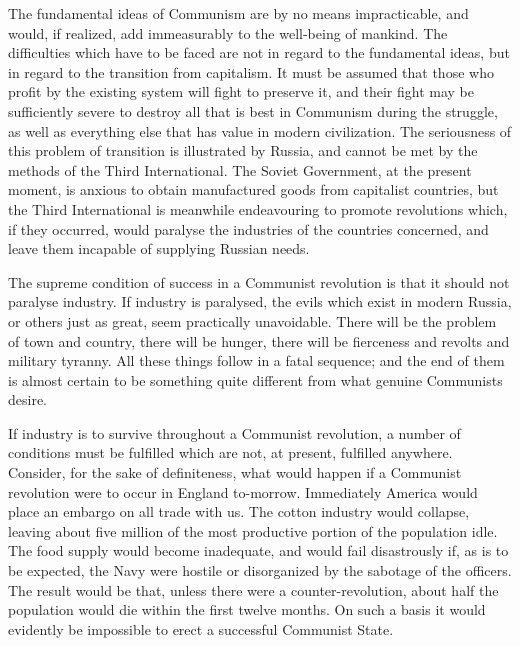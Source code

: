 The fundamental ideas of Communism are by no means impracticable, and would, if realized, add immeasurably to the well-being of mankind. The difficulties which have to be faced are not in regard to the fundamental ideas, but in regard to the transition from capitalism. It must be assumed that those who profit by the existing system will fight to preserve it, and their fight may be sufficiently severe to destroy all that is best in Communism during the struggle, as well as everything else that has value in modern civilization. The seriousness of this problem of transition is illustrated by Russia, and cannot be met by the methods of the Third International. The Soviet Government, at the present moment, is anxious to obtain manufactured goods from capitalist countries, but the Third International is meanwhile endeavouring to promote revolutions which, if they occurred, would paralyse the industries of the countries concerned, and leave them incapable of supplying Russian needs.

The supreme condition of success in a Communist revolution is that it should not paralyse industry. If industry is paralysed, the evils which exist in modern Russia, or others just as great, seem practically unavoidable. There will be the problem of town and country, there will be hunger, there will be fierceness and revolts and military tyranny. All these things follow in a fatal sequence; and the end of them is almost certain to be something quite different from what genuine Communists desire.

If industry is to survive throughout a Communist revolution, a number of conditions must be fulfilled which are not, at present, fulfilled anywhere. Consider, for the sake of definiteness, what would happen if a Communist revolution were to occur in England to-morrow. Immediately America would place an embargo on all trade with us. The cotton industry would collapse, leaving about five million of the most productive portion of the population idle. The food supply would become inadequate, and would fail disastrously if, as is to be expected, the Navy were hostile or disorganized by the sabotage of the officers. The result would be that, unless there were a counter-revolution, about half the population would die within the first twelve months. On such a basis it would evidently be impossible to erect a successful Communist State.

